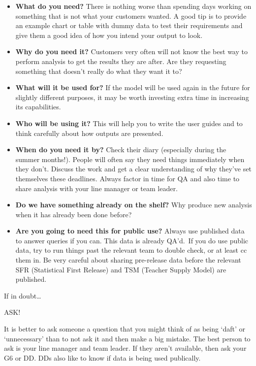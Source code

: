 \documentclass[
]{article}
\begin{document}
\begin{itemize}
\item
  \textbf{What do you need?} There is nothing worse than spending days working on something that is not what your customers wanted. A good tip is to provide an example chart or table with dummy data to test their requirements and give them a good idea of how you intend your output to look.
\item
  \textbf{Why do you need it?} Customers very often will not know the best way to perform analysis to get the results they are after. Are they requesting something that doesn't really do what they want it to?
\item
  \textbf{What will it be used for?} If the model will be used again in the future for slightly different purposes, it may be worth investing extra time in increasing its capabilities.
\item
  \textbf{Who will be using it?} This will help you to write the user guides and to think carefully about how outputs are presented.
\item
  \textbf{When do you need it by?} Check their diary (especially during the summer months!). People will often say they need things immediately when they don't. Discuss the work and get a clear understanding of why they've set themselves these deadlines. Always factor in time for QA and also time to share analysis with your line manager or team leader.
\item
  \textbf{Do we have something already on the shelf?} Why produce new analysis when it has already been done before?
\item
  \textbf{Are you going to need this for public use?} Always use published data to answer queries if you can. This data is already QA'd.~If you do use public data, try to run things past the relevant team to double check, or at least cc them in. Be very careful about sharing pre-release data before the relevant SFR (Statistical First Release) and TSM (Teacher Supply Model) are published.
\end{itemize}

If in doubt\ldots{}

ASK!

It is better to ask someone a question that you might think of as being `daft' or `unnecessary' than to not ask it and then make a big mistake. The best person to ask is your line manager and team leader. If they aren't available, then ask your G6 or DD. DDs also like to know if data is being used publically.
\end{document}
